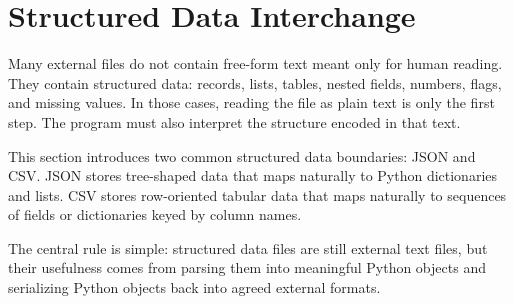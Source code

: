 \section{Structured Data Interchange}

Many external files do not contain free-form text meant only for human reading. They contain structured data: records, lists, tables, nested fields, numbers, flags, and missing values. In those cases, reading the file as plain text is only the first step. The program must also interpret the structure encoded in that text.

This section introduces two common structured data boundaries: JSON and CSV. JSON stores tree-shaped data that maps naturally to Python dictionaries and lists. CSV stores row-oriented tabular data that maps naturally to sequences of fields or dictionaries keyed by column names.

The central rule is simple: structured data files are still external text files, but their usefulness comes from parsing them into meaningful Python objects and serializing Python objects back into agreed external formats.